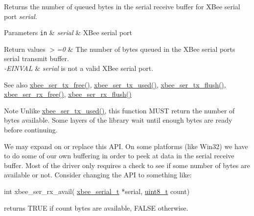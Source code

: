 Returns the number of queued bytes in the serial receive buffer for X\+Bee serial port {\itshape serial}. 


\begin{DoxyParams}[1]{Parameters}
\mbox{\tt in}  & {\em serial} & X\+Bee serial port\\
\hline
\end{DoxyParams}

\begin{DoxyRetVals}{Return values}
{\em $>$=0} & The number of bytes queued in the X\+Bee serial port\textquotesingle{}s serial transmit buffer. \\
\hline
{\em -\/\+E\+I\+N\+V\+AL} & {\itshape serial} is not a valid X\+Bee serial port.\\
\hline
\end{DoxyRetVals}
\begin{DoxySeeAlso}{See also}
\hyperlink{group__xbee__serial_ga3ad8f378b572d6fec982f1086bd3b94f}{xbee\+\_\+ser\+\_\+tx\+\_\+free()}, \hyperlink{group__xbee__serial_gaabf70934d186354cde4ac14ed27d1bd2}{xbee\+\_\+ser\+\_\+tx\+\_\+used()}, \hyperlink{group__xbee__serial_ga05308d37301d27715f1e1308b7189220}{xbee\+\_\+ser\+\_\+tx\+\_\+flush()}, \hyperlink{group__xbee__serial_ga16fb431a1e66861439518e562431821f}{xbee\+\_\+ser\+\_\+rx\+\_\+free()}, \hyperlink{group__xbee__serial_ga98a6d5ceb5e1445e8ef82ccaa65a8c15}{xbee\+\_\+ser\+\_\+rx\+\_\+flush()}
\end{DoxySeeAlso}
\begin{DoxyNote}{Note}
Unlike \hyperlink{group__xbee__serial_gaabf70934d186354cde4ac14ed27d1bd2}{xbee\+\_\+ser\+\_\+tx\+\_\+used()}, this function M\+U\+ST return the number of bytes available. Some layers of the library wait until enough bytes are ready before continuing.
\end{DoxyNote}
We may expand on or replace this A\+PI. On some platforms (like Win32) we have to do some of our own buffering in order to peek at data in the serial receive buffer. Most of the driver only requires a check to see if some number of bytes are available or not. Consider changing the A\+PI to something like\+:


\begin{DoxyCode}
\textcolor{keywordtype}{int} xbee\_ser\_rx\_avail( \hyperlink{structxbee__serial__t}{xbee\_serial\_t} *serial, \hyperlink{group__hal__dos_gae1affc9ca37cfb624959c866a73f83c2}{uint8\_t} count)
\end{DoxyCode}
 returns T\+R\+UE if {\ttfamily count} bytes are available, F\+A\+L\+SE otherwise. \mbox{\label{group__hal__kl25_gad1b1f9f42e58d8299ddcca1c9cb3c5e8}} 
